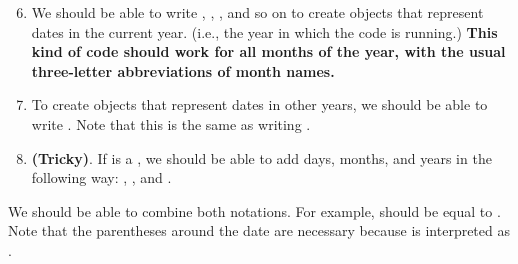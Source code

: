 \begin{enumerate}

  \setcounter{enumi}{5}

  \item We should be able to write , , , and so on to create  objects that represent dates in the current year. (i.e., the year in which the code is running.) \textbf{This kind of code should work for all months of the year, with the usual three-letter abbreviations of month names.}

  \item To create  objects that represent dates in other years, we should be able to write . Note that this is the same as writing .

  \item \textbf{(Tricky)}. If  is a  , we should be able to add days, months, and years in the following way: , , and .

\end{enumerate}

We should be able to combine both notations. For example,  should be equal to . Note that the parentheses around the date are necessary because  is interpreted as . 


